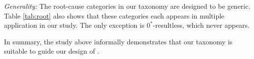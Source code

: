 \textit{Generality:}
The root-cause categories in our taxonomy are designed to be 
generic. Table \ref{tab:root} also shows that these categories 
each appears in multiple
application in our study. The only exception is $0^*$-resultless, which
never appears. 


In summary, the study above informally demonstrates that our taxonomy
is suitable to guide our design of \Tool.
%


